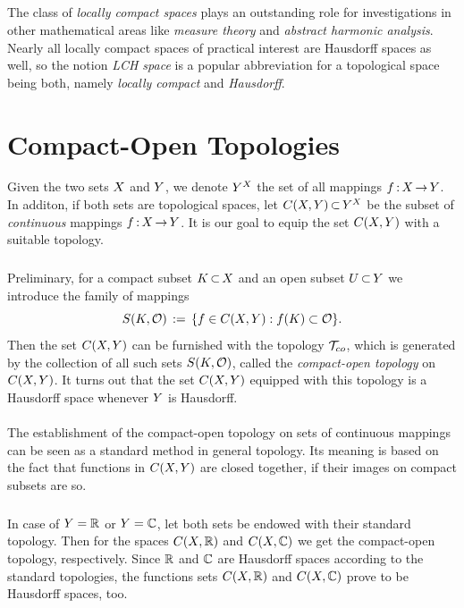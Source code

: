\documentclass[11pt,twoside]{article}
\begin{document}
\subparagraph{} %
The class of \textit{locally compact spaces} plays an outstanding role
for investigations in other mathematical areas like
\textit{measure theory} and \textit{abstract harmonic analysis}.
Nearly all locally compact spaces of practical interest
are Hausdorff spaces as well,
so the notion \textit{LCH space} is a popular abbreviation for
a topological space being both,
namely \textit{locally compact} and \textit{Hausdorff}.

\section{Compact-Open Topologies}                                              %
Given the two sets $X$ and $Y$,
we denote $Y^{X}$ the set of all mappings $f {\,:\,} X {\,\to\,} Y$.
In additon,
if both sets are topological spaces,
let $C(X,Y) {\,\subset\,} Y^{X}$ be the subset
of \textit{continuous} mappings $f {\,:\,} X {\,\to\,} Y$.
It is our goal to equip the set $C(X,Y)$ with a suitable topology.

\subparagraph{} %
Preliminary,
for a compact subset ${K} {\,\subset\,} X$ and an open subset
$U {\,\subset\,} Y$ we introduce the family of mappings
\[
S({K},\mathcal{O}) \,:=\, \{f \in C(X,Y): f({K}) \subset \mathcal{O} \}.
\]
Then the set $C(X,Y)$ can be furnished with the topology $\mathcal{T}_{co}$,
which is generated by the collection of all such sets $S({K},\mathcal{O})$,
called the \textit{compact-open topology} on $C(X,Y)$.
It turns out
that the set $C(X,Y)$ equipped with this topology is a Hausdorff space
whenever $Y$ is Hausdorff.

\paragraph{}
The establishment of the compact-open topology on sets of continuous mappings
can be seen as a standard method in general topology.
Its meaning is based on the fact that
functions in $C(X,Y)$ are closed together,
if their images on compact subsets are so.

\subparagraph{}
In case of $Y={\mathbb{R}}$ or $Y={\mathbb{C}}$,
let both sets be endowed with their standard topology.
Then for the spaces $C(X,{\mathbb{R}})$ and $C(X,{\mathbb{C}})$
we get the compact-open topology,
respectively.
Since ${\mathbb{R}}$ and ${\mathbb{C}}$ are Hausdorff spaces according to the standard topologies,
the functions sets $C(X,{\mathbb{R}})$ and $C(X,{\mathbb{C}})$ prove to be Hausdorff spaces,
too.
\end{document}
